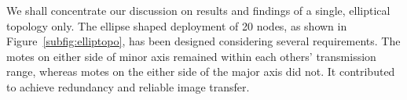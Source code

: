 \documentclass[conference,manuscript]{IEEEtran}
\newcommand{\notedme}[1]{\raisebox{0pt}[0pt][0pt]{\pdfcomment[open=true,color=blue]{#1}}}
\begin{document}

We shall concentrate our discussion on results and findings of a single, elliptical topology only.
The ellipse shaped deployment of 20 nodes, as shown in Figure~\ref{subfig:elliptopo}, has been designed considering several requirements.
The motes on either side of minor axis remained within each others' transmission range, whereas motes on the either side of the major axis did not.
It contributed to achieve  redundancy and  reliable image transfer. 
\end{document}
